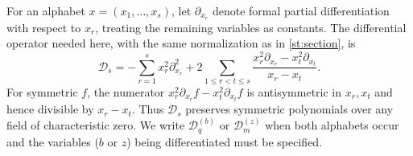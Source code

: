 \documentclass[reqno, 12pt]{article}
\numberwithin{equation}{section}
\theoremstyle{definition}
\begin{document}
For an alphabet $x=(x_1,\ldots,x_s)$, let
$\partial_{x_r}$ denote formal partial differentiation with
respect to $x_r$, treating the remaining variables as constants.
The differential operator needed here, with the same normalization
as in \cref{st:section}, is
\begin{equation}\label{ct:operator}
 \mathcal D_s
 =-\sum_{r=1}^{s}x_r^2\partial_{x_r}^2
 +2\sum_{1\leq r<t\leq s}
 \frac{x_r^2\partial_{x_r}-x_t^2\partial_{x_t}}{x_r-x_t}.
\end{equation}
For symmetric $f$, the numerator
$x_r^2\partial_{x_r}f-x_t^2\partial_{x_t}f$ is antisymmetric in
$x_r,x_t$ and hence divisible by $x_r-x_t$.  Thus
$\mathcal D_s$ preserves symmetric polynomials over any field
of characteristic zero.
We write $\mathcal D_q^{(b)}$ or $\mathcal D_m^{(z)}$ when both
alphabets occur and the variables ($b$ or $z$) being differentiated must be
specified.
\end{document}
